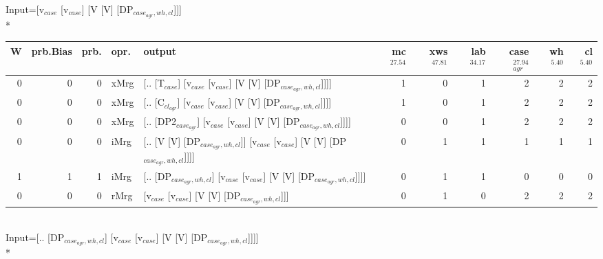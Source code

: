 \begingroup\scriptsize Input=[v$_{case}$ [v$_{case}$] [V [V] [DP$_{case_{agr},wh,cl}$]]]\\*
\begin{tabularx}{\linewidth}{rrrlXrrrrrr}
\hline
   W &   prb.Bias &   prb. & opr.   & output                                                                         &   mc$^{27.54}$ &   xws$^{47.81}$ &   lab$^{34.17}$ &   case$_{agr}^{27.94}$ &   wh$^{5.40}$ &   cl$^{5.40}$ \\
\hline
   0 &       0 &   0 & xMrg & [.. [T$_{case}$] [v$_{case}$ [v$_{case}$] [V [V] [DP$_{case_{agr},wh,cl}$]]]]                    &            1 &             0 &             1 &                  2 &           2 &           2 \\
   0 &       0 &   0 & xMrg & [.. [C$_{cl_{agr}}$] [v$_{case}$ [v$_{case}$] [V [V] [DP$_{case_{agr},wh,cl}$]]]]                  &            1 &             0 &             1 &                  2 &           2 &           2 \\
   0 &       0 &   0 & xMrg & [.. [DP2$_{case_{agr}}$] [v$_{case}$ [v$_{case}$] [V [V] [DP$_{case_{agr},wh,cl}$]]]]              &            0 &             0 &             1 &                  2 &           2 &           2 \\
   0 &       0 &   0 & iMrg & [.. [V [V] [DP$_{case_{agr},wh,cl}$]] [v$_{case}$ [v$_{case}$] [V [V] [DP$_{case_{agr},wh,cl}$]]]] &            0 &             1 &             1 &                  1 &           1 &           1 \\
   1 &       1 &   1 & iMrg & [.. [DP$_{case_{agr},wh,cl}$] [v$_{case}$ [v$_{case}$] [V [V] [DP$_{case_{agr},wh,cl}$]]]]         &            0 &             1 &             1 &                  0 &           0 &           0 \\
   0 &       0 &   0 & rMrg & [v$_{case}$ [v$_{case}$] [V [V] [DP$_{case_{agr},wh,cl}$]]]                                  &            0 &             1 &             0 &                  2 &           2 &           2 \\
\hline
\end{tabularx}\endgroup\\
\begingroup\scriptsize Input=[.. [DP$_{case_{agr},wh,cl}$] [v$_{case}$ [v$_{case}$] [V [V] [DP$_{case_{agr},wh,cl}$]]]]\\*
